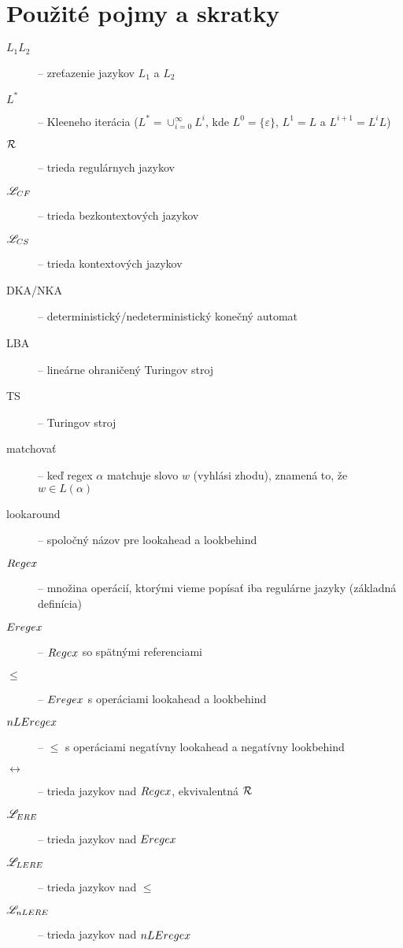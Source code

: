 \chapter*{Použité pojmy a skratky}
\label{chap:pojmy}
{}

\begin{description}
\item[$ L_{1}L_{2} $] -- zreťazenie jazykov $ L_{1} $ a $ L_{2} $
\item[$ L^* $] -- Kleeneho iterácia ($L^*=\cup^{\infty}_{i=0}L^i$, kde $L^0=\lbrace \varepsilon \rbrace$, $L^1=L$ a $L^{i+1}=L^iL$)
\item[$ {\cal R} $] -- trieda regulárnych jazykov
\item[$ \mathscr{L}_{CF}$] -- trieda bezkontextových jazykov
\item[$ \mathscr{L}_{CS}$] -- trieda kontextových jazykov
\item[DKA/NKA] -- deterministický/nedeterministický konečný automat
\item[LBA] -- lineárne ohraničený Turingov stroj
\item[TS] -- Turingov stroj
\item[matchovať] -- keď regex $\alpha$ matchuje slovo $w$ (vyhlási zhodu), znamená to, že $w\in L(\alpha)$
\item[lookaround] -- spoločný názov pre lookahead a lookbehind

\item[$Regex$] -- množina operácií, ktorými vieme popísať iba regulárne jazyky (základná definícia)
\item[$Eregex$] -- $Regex$ so spätnými referenciami
\item[$\le$] -- $Eregex$ s operáciami lookahead a lookbehind
\item[$nLEregex$] -- $\le$ s operáciami negatívny lookahead a negatívny lookbehind
\item[$\rel$] -- trieda jazykov nad $Regex$, ekvivalentná ${\cal R}$
\item[$\mathscr{L}_{ERE}$] -- trieda jazykov nad $Eregex$
\item[$\mathscr{L}_{LERE}$] -- trieda jazykov nad $\le$
\item[$\mathscr{L}_{nLERE}$] -- trieda jazykov nad $nLEregex$
\end{description}